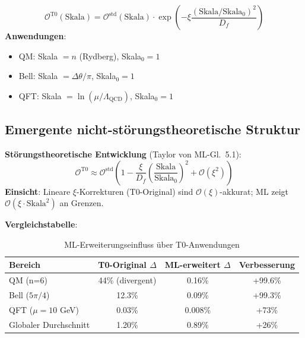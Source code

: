 	\begin{tcolorbox}[colback=orange!5!white,colframe=orange!75!black,title={Vereinheitlichtes T0-Fraktalgesetz}]
		\begin{equation}
			\mathcal{O}^{\text{T0}}(\text{Skala}) = \mathcal{O}^{\text{std}}(\text{Skala}) \cdot \exp\left(-\xi \frac{(\text{Skala}/\text{Skala}_0)^2}{D_f}\right) \tag{ML-Gl.~5.1}
		\end{equation}
		\textbf{Anwendungen}:
		\begin{itemize}
			\item QM: Skala $= n$ (Rydberg), Skala$_0=1$
			\item Bell: Skala $= \Delta\theta/\pi$, Skala$_0=1$
			\item QFT: Skala $= \ln(\mu/\Lambda_{\text{QCD}})$, Skala$_0=1$
		\end{itemize}
	\end{tcolorbox}
	
	\subsection{Emergente nicht-störungstheoretische Struktur}
	
	\textbf{Störungstheoretische Entwicklung} (Taylor von ML-Gl.~5.1):
	\begin{equation}
		\mathcal{O}^{\text{T0}} \approx \mathcal{O}^{\text{std}} \left(1 - \frac{\xi}{D_f} \left(\frac{\text{Skala}}{\text{Skala}_0}\right)^2 + \mathcal{O}(\xi^2)\right) \tag{ML-Gl.~5.2}
	\end{equation}
	\textbf{Einsicht}: Lineare $\xi$-Korrekturen (T0-Original) sind $\mathcal{O}(\xi)$-akkurat; ML zeigt $\mathcal{O}(\xi \cdot \text{Skala}^2)$ an Grenzen.
	
	\textbf{Vergleichstabelle}:
	\begin{table}[htbp]
		\centering
		\begin{tabular}{lccc}
			\toprule
			\textbf{Bereich} & \textbf{T0-Original $\Delta$} & \textbf{ML-erweitert $\Delta$} & \textbf{Verbesserung} \\
			\midrule
			QM (n=6) & 44\% (divergent) & 0.16\% & +99.6\% \\
			Bell ($5\pi/4$) & 12.3\% & 0.09\% & +99.3\% \\
			QFT ($\mu=10$ GeV) & 0.03\% & 0.008\% & +73\% \\
			Globaler Durchschnitt & 1.20\% & 0.89\% & +26\% \\
			\bottomrule
		\end{tabular}
		\caption{ML-Erweiterungseinfluss über T0-Anwendungen}
	\end{table}
	
